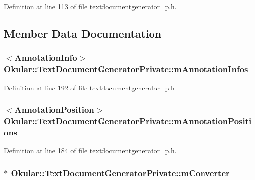 Definition at line 113 of file textdocumentgenerator\+\_\+p.\+h.



\subsection{Member Data Documentation}
\hypertarget{classOkular_1_1TextDocumentGeneratorPrivate_ae2e334678a1fa943878aec4c55b30cf7}{
\subsubsection[{m\+Annotation\+Infos}]{$<${\bf Annotation\+Info}$>$ Okular\+::\+Text\+Document\+Generator\+Private\+::m\+Annotation\+Infos}}\label{classOkular_1_1TextDocumentGeneratorPrivate_ae2e334678a1fa943878aec4c55b30cf7}


Definition at line 192 of file textdocumentgenerator\+\_\+p.\+h.

\hypertarget{classOkular_1_1TextDocumentGeneratorPrivate_a901bfd4fee249261a7816ccf96609801}{
\subsubsection[{m\+Annotation\+Positions}]{$<${\bf Annotation\+Position}$>$ Okular\+::\+Text\+Document\+Generator\+Private\+::m\+Annotation\+Positions}}\label{classOkular_1_1TextDocumentGeneratorPrivate_a901bfd4fee249261a7816ccf96609801}


Definition at line 184 of file textdocumentgenerator\+\_\+p.\+h.

\hypertarget{classOkular_1_1TextDocumentGeneratorPrivate_afe4df409b1e2fba52c7a027454d4eeef}{
\subsubsection[{m\+Converter}]{$\ast$ Okular\+::\+Text\+Document\+Generator\+Private\+::m\+Converter}}\label{classOkular_1_1TextDocumentGeneratorPrivate_afe4df409b1e2fba52c7a027454d4eeef}


